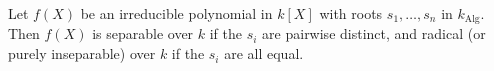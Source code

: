 Let $f(X)$ be an irreducible polynomial in $k[X]$ with roots $s_1, \ldots, s_n$ in $k_{\text{Alg}}$. Then $f(X)$ is separable over $k$ if the $s_i$ are pairwise distinct, and radical (or purely inseparable) over $k$ if the $s_i$ are all equal.
